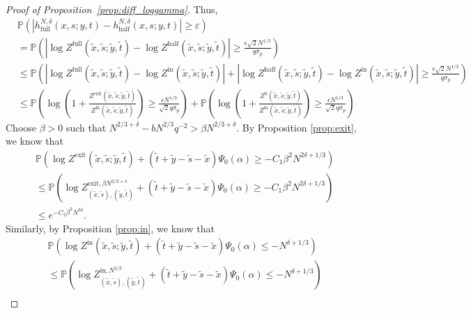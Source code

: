 \documentclass[11pt]{article}
\theoremstyle{definition}
\newcommand{\Prob}{\mathbb{P}}
\newcommand{\Zfull}{Z^{\mathrm{full}}}
\newcommand{\Zhalf}{Z^{\mathrm{half}}}
\newcommand{\Zin}{Z^{\mathrm{in}}}
\newcommand{\Zexit}{Z^{\mathrm{exit}}}
\newcommand{\Zb}{Z^{\mathrm{b}}}
\begin{document}
\begin{proof}[Proof of Proposition~\ref{prop:diff_loggamma}]
Thus, 
\begin{equation}
    \begin{aligned}
    &\Prob\left( \left|h_{\mathrm{full}}^{N,\delta}(x,s;y,t) - h_{\mathrm{half}}^{N,\delta}(x,s;y,t)  \right| \geq \varepsilon \right)\\
        &=\Prob\left( \left|\log \Zfull(\tilde{x}, \tilde{s};\tilde{y}, \tilde{t}) -  \log \Zhalf(\tilde{x}, \tilde{s};\tilde{y}, \tilde{t}) \right| \geq \frac{\epsilon \sqrt{2}N^{1/3}}{q\sigma_p} \right)\\
        &\leq  \Prob\left( \left|\log \Zfull(\tilde{x}, \tilde{s};\tilde{y}, \tilde{t}) - \log \Zin(\tilde{x}, \tilde{s};\tilde{y}, \tilde{t})\right| + \left|  \log \Zhalf(\tilde{x}, \tilde{s};\tilde{y}, \tilde{t})- \log \Zin(\tilde{x}, \tilde{s};\tilde{y}, \tilde{t}) \right| \geq \frac{\epsilon \sqrt{2}N^{1/3}}{q\sigma_p} \right)\\
&\leq \Prob \left( \log\left(1+ \frac{\Zexit(\tilde{x}, \tilde{s};\tilde{y}, \tilde{t})}{\Zin(\tilde{x}, \tilde{s};\tilde{y}, \tilde{t})}\right) \geq \frac{\epsilon N^{1/3}}{\sqrt{2}q\sigma_p}\right) + \Prob \left( \log  \left(1+ \frac{\Zb(\tilde{x}, \tilde{s};\tilde{y}, \tilde{t})}{\Zin(\tilde{x}, \tilde{s};\tilde{y}, \tilde{t})}\right) \geq \frac{\epsilon N^{1/3}}{\sqrt{2}q\sigma_p} \right)
\end{aligned}
\end{equation}
Choose $\beta > 0$ such that $N^{2/3+\delta} - bN^{2/3}q^{-2} > \beta N^{2/3+\delta}$. By Proposition \ref{prop:exit}, we know that 
\[
\begin{aligned}
&\Prob(\log \Zexit(\tilde{x}, \tilde{s};\tilde{y}, \tilde{t}) + (\tilde{t}+\tilde{y}-\tilde{s}-\tilde{x})\Psi_0(\alpha) \geq -C_1\beta^2N^{2\delta + 1/3})\\
&\leq \Prob(\log Z^{\mathrm{exit},\beta N^{2/3+\delta}}_{(\tilde{x}, \tilde{s}),
(\tilde{y}, \tilde{t})} + (\tilde{t}+\tilde{y}-\tilde{s}-\tilde{x})\Psi_0(\alpha) \geq -C_1\beta^2N^{2\delta + 1/3})\\
&\leq e^{-C_2\beta^3N^{3\delta}}.
\end{aligned}
\]
Similarly, by Proposition \ref{prop:in}, we know that 
\[
\begin{aligned}
&\Prob(\log \Zin(\tilde{x}, \tilde{s};\tilde{y}, \tilde{t}) + (\tilde{t}+\tilde{y}-\tilde{s}-\tilde{x})\Psi_0(\alpha) \leq -N^{\delta + 1/3})\\
&\leq \Prob(\log Z^{\mathrm{in}, N^{2/3}}_{(\tilde{x}, \tilde{s}),
(\tilde{y}, \tilde{t})} + (\tilde{t}+\tilde{y}-\tilde{s}-\tilde{x})\Psi_0(\alpha) \leq -N^{\delta + 1/3})\\

\end{aligned}\]
\end{proof}
\end{document}
